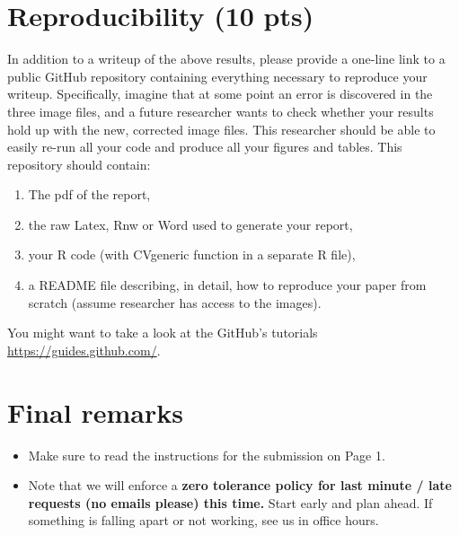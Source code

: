 \documentclass[11pt]{article}\usepackage[]{graphicx}\usepackage[]{color}
\begin{document}
\section{Reproducibility (10 pts)}
In addition to a writeup of the above results, please provide a one-line link 
to a public GitHub repository containing everything necessary to reproduce
your writeup. Specifically, imagine that at some point an error is discovered
in the three image files, and a future researcher wants to check whether
your results hold up with the new, corrected image files. This researcher
should be able to easily re-run all your code and produce all your figures
and tables. This repository should contain:
\begin{enumerate}[label=(\roman*)]
  \item The pdf of the report,
  \item the raw Latex, Rnw or Word used to generate your report,
  \item your R code (with CVgeneric function in a separate R file),
  \item a README file describing, in detail, how to reproduce your paper
  from scratch (assume researcher has access to the images).
\end{enumerate}
You might want to take a look at the GitHub's tutorials 
\href{https://guides.github.com/}{https://guides.github.com/}.

\section*{Final remarks} %
\label{sec:final_remarks}
\begin{itemize}
  \item Make sure to read the instructions for the submission on Page
  1.
  \item Note that we will enforce a \textbf{zero tolerance policy for last
  minute / late requests (no emails please) this time.} Start early and
  plan ahead. If something
  is falling apart or not working, see us in office hours.
\end{itemize}
\end{document}
